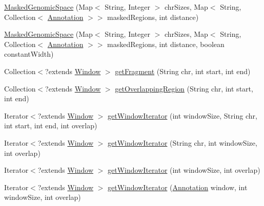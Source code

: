 \begin{DoxyCompactItemize}
\item 
\hyperlink{classumms_1_1core_1_1coordinatesystem_1_1_masked_genomic_space_acdb954e5aa8cacf86607b8a7e9a29cd4}{Masked\+Genomic\+Space} (Map$<$ String, Integer $>$ chr\+Sizes, Map$<$ String, Collection$<$ \hyperlink{interfaceumms_1_1core_1_1annotation_1_1_annotation}{Annotation} $>$$>$ masked\+Regions, int distance)
\item 
\hyperlink{classumms_1_1core_1_1coordinatesystem_1_1_masked_genomic_space_aa052cc835953a6ca4be0de173aa98088}{Masked\+Genomic\+Space} (Map$<$ String, Integer $>$ chr\+Sizes, Map$<$ String, Collection$<$ \hyperlink{interfaceumms_1_1core_1_1annotation_1_1_annotation}{Annotation} $>$$>$ masked\+Regions, int distance, boolean constant\+Width)
\item 
Collection$<$?extends \hyperlink{interfaceumms_1_1core_1_1feature_1_1_window}{Window} $>$ \hyperlink{classumms_1_1core_1_1coordinatesystem_1_1_masked_genomic_space_a5e2c87159db2089d61cc9d3d7e438486}{get\+Fragment} (String chr, int start, int end)
\item 
Collection$<$?extends \hyperlink{interfaceumms_1_1core_1_1feature_1_1_window}{Window} $>$ \hyperlink{classumms_1_1core_1_1coordinatesystem_1_1_masked_genomic_space_aec28f0413edd73d141901a8c70a3d443}{get\+Overlapping\+Region} (String chr, int start, int end)
\item 
Iterator$<$?extends \hyperlink{interfaceumms_1_1core_1_1feature_1_1_window}{Window} $>$ \hyperlink{classumms_1_1core_1_1coordinatesystem_1_1_masked_genomic_space_a289270abf51ab4ffe5582092cdc25a34}{get\+Window\+Iterator} (int window\+Size, String chr, int start, int end, int overlap)
\item 
Iterator$<$?extends \hyperlink{interfaceumms_1_1core_1_1feature_1_1_window}{Window} $>$ \hyperlink{classumms_1_1core_1_1coordinatesystem_1_1_masked_genomic_space_a49f6b163c22fbfa6f2ff8098cfc70a30}{get\+Window\+Iterator} (String chr, int window\+Size, int overlap)
\item 
Iterator$<$?extends \hyperlink{interfaceumms_1_1core_1_1feature_1_1_window}{Window} $>$ \hyperlink{classumms_1_1core_1_1coordinatesystem_1_1_masked_genomic_space_ac4f511b9a5e9247a597d308a1e469fb1}{get\+Window\+Iterator} (int window\+Size, int overlap)
\item 
Iterator$<$?extends \hyperlink{interfaceumms_1_1core_1_1feature_1_1_window}{Window} $>$ \hyperlink{classumms_1_1core_1_1coordinatesystem_1_1_masked_genomic_space_ac115e2a6661d72819e378be1204833ec}{get\+Window\+Iterator} (\hyperlink{interfaceumms_1_1core_1_1annotation_1_1_annotation}{Annotation} window, int window\+Size, int overlap)

\end{DoxyCompactItemize}
